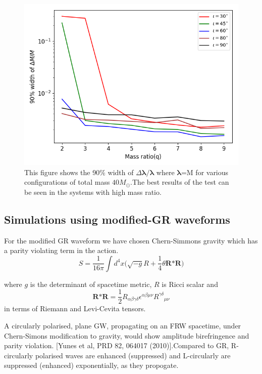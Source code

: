 \documentclass[prd,preprintnumbers,twocolumn,eqsecnum,floatfix,a4paper,nofootinbib,superscriptaddress]{revtex4}
\newcommand{\blambda}{\bm{\lambda}}
\begin{document}
\begin{figure}[h]
	\includegraphics*[scale=0.5]{./../../plots/90_percent_width_dM}
	\caption{This figure shows the 90$\%$ width of $\Delta \blambda/\blambda$ where $\blambda$=M for various configurations of total mass $40M_{\odot}$.The best results of the test can be seen in the systems with high mass ratio.}
\end{figure}

\subsection{Simulations using modified-GR waveforms}
For the modified GR waveform we have chosen Chern-Simmons gravity which has a parity violating term in the action.
\begin{equation}
S=\frac{1}{16\pi}\int d^4 x\Big(\sqrt{-g}R+\frac{1}{4}\theta\textbf{R*R}\Big)
\end{equation}


where $g$ is the determinant of spacetime metric, $R$ is 
Ricci scalar and 
\begin{equation}
\textbf{R*R}=\frac{1}{2}R_{\alpha\beta\gamma\delta}\epsilon^{\alpha\beta\mu\nu}{R^{\gamma\delta}}_{\mu\nu}
\end{equation}
in terms of Riemann and Levi-Cevita tensors.


A circularly polarised, plane GW, propagating on
an FRW spacetime, under Chern-Simons
modification to gravity, would show amplitude
birefringence and parity violation. [Yunes et al,
PRD 82, 064017 (2010)].Compared to GR, R-circularly polarised waves are enhanced (suppressed) and L-circularly are suppressed (enhanced) exponentially, as they propogate.
\end{document}
